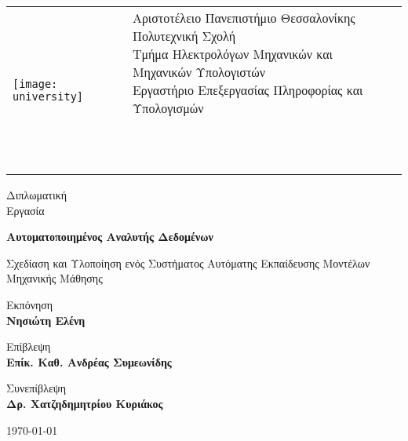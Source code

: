 \begin{titlepage}
	
\begin{tabular}{ll}
	\texttt{[image: university]} &\makecell[l]{ \small Αριστοτέλειο Πανεπιστήμιο Θεσσαλονίκης\\Πολυτεχνική Σχολή\\Τμήμα Ηλεκτρολόγων Μηχανικών και Μηχανικών Υπολογιστών\\Εργαστήριο Επεξεργασίας Πληροφορίας και Υπολογισμών\\
		\\
		\\ \\}
\end{tabular}
\begin{center}	

			
		\vspace{1cm}
		
		\LARGE
		Διπλωματική\\
		Εργασία		
		\vspace{0.3cm}
		
		\Huge
		\textbf{Αυτοματοποιημένος Αναλυτής Δεδομένων}
		
		\vspace{0.3cm}
		\LARGE
		Σχεδίαση και Υλοποίηση ενός Συστήματος Αυτόματης Εκπαίδευσης Μοντέλων Μηχανικής Μάθησης
		
		\vspace{1.5cm}
		
		Εκπόνηση \\
		\textbf{Νησιώτη Ελένη}
		
		\vspace{1.5cm}
		
		Επίβλεψη \\
		\textbf{Επίκ. Καθ. Ανδρέας Συμεωνίδης}
		
		Συνεπίβλεψη \\
		\textbf{Δρ. Χατζηδημητρίου Κυριάκος}
		
		\vspace{1cm}
					
		\today

		
	\end{center}
\end{titlepage}

